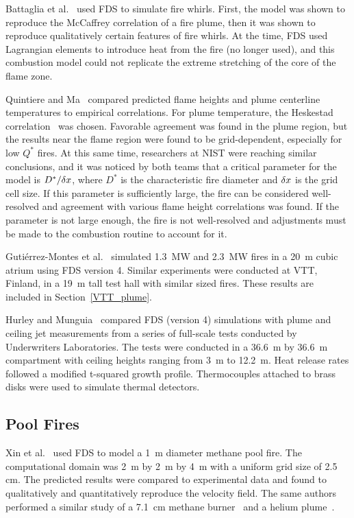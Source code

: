 Battaglia et al.~\cite{Battaglia:1} used FDS to simulate fire whirls.  First, the model was shown to reproduce the McCaffrey correlation of a fire plume,  then it was shown to reproduce qualitatively certain features of fire whirls. At the time, FDS used Lagrangian elements to introduce heat from the fire (no longer used), and this combustion model could not replicate the extreme stretching of the core of the flame zone.

Quintiere and Ma~\cite{Ma:2,Ma:3} compared predicted flame heights and plume centerline temperatures to empirical correlations.  For plume temperature,  the Heskestad  correlation~\cite{SFPE:Heskestad} was chosen. Favorable agreement was found in the plume region, but the results near the flame region were found to be grid-dependent, especially for low $Q^*$ fires. At this same time, researchers at NIST were reaching similar conclusions, and it was noticed by both teams that a critical parameter for the model is $D^*/\delta x$, where $D^*$ is the characteristic fire diameter and $\delta x$ is the grid cell size. If this parameter is sufficiently large, the fire can be considered well-resolved and agreement with various flame height correlations was found. If the parameter is not large enough, the fire is not well-resolved and adjustments must be made to the combustion routine to account for it.

Guti\'{e}rrez-Montes et al.~\cite{Gutierrez:Building_and_Environment} simulated 1.3~MW and 2.3~MW fires in a 20~m cubic atrium using FDS version 4. Similar experiments were conducted at VTT, Finland, in a 19~m tall test hall with similar sized fires. These results are included in Section~\ref{VTT_plume}.

Hurley and Munguia~\cite{Hurley:GCR09-921,Hurley:JFPE2009} compared FDS (version 4) simulations with plume and ceiling jet measurements from a series of full-scale tests conducted by Underwriters Laboratories. The tests were conducted in a 36.6~m by 36.6~m compartment with ceiling heights ranging from 3~m to 12.2~m. Heat release rates followed a modified t-squared growth profile. Thermocouples attached to brass disks were used to simulate thermal detectors.


\subsection{Pool Fires}

Xin et al.~\cite{Xin:JSS2005} used FDS to model a 1~m diameter methane pool fire. The computational domain was 2~m by 2~m by 4~m with a uniform grid size of 2.5 cm. The predicted results were compared to  experimental data and found  to qualitatively and quantitatively reproduce  the velocity field.  The same authors performed a similar study of a 7.1~cm methane burner~\cite{Xin:CF2005} and a helium plume~\cite{Xin:CS2002}.

